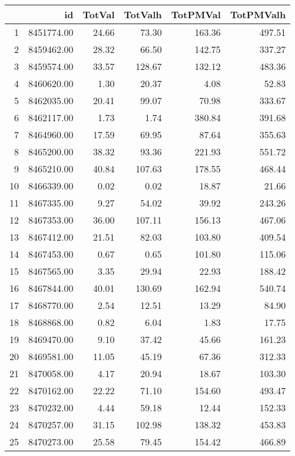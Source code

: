 \begin{table}[ht]
\centering
\begin{tabular}{rrrrrr}
  \hline
 & id & TotVal & TotValh & TotPMVal & TotPMValh \\ 
  \hline
1 & 8451774.00 & 24.66 & 73.30 & 163.36 & 497.51 \\ 
  2 & 8459462.00 & 28.32 & 66.50 & 142.75 & 337.27 \\ 
  3 & 8459574.00 & 33.57 & 128.67 & 132.12 & 483.36 \\ 
  4 & 8460620.00 & 1.30 & 20.37 & 4.08 & 52.83 \\ 
  5 & 8462035.00 & 20.41 & 99.07 & 70.98 & 333.67 \\ 
  6 & 8462117.00 & 1.73 & 1.74 & 380.84 & 391.68 \\ 
  7 & 8464960.00 & 17.59 & 69.95 & 87.64 & 355.63 \\ 
  8 & 8465200.00 & 38.32 & 93.36 & 221.93 & 551.72 \\ 
  9 & 8465210.00 & 40.84 & 107.63 & 178.55 & 468.44 \\ 
  10 & 8466339.00 & 0.02 & 0.02 & 18.87 & 21.66 \\ 
  11 & 8467335.00 & 9.27 & 54.02 & 39.92 & 243.26 \\ 
  12 & 8467353.00 & 36.00 & 107.11 & 156.13 & 467.06 \\ 
  13 & 8467412.00 & 21.51 & 82.03 & 103.80 & 409.54 \\ 
  14 & 8467453.00 & 0.67 & 0.65 & 101.80 & 115.06 \\ 
  15 & 8467565.00 & 3.35 & 29.94 & 22.93 & 188.42 \\ 
  16 & 8467844.00 & 40.01 & 130.69 & 162.94 & 540.74 \\ 
  17 & 8468770.00 & 2.54 & 12.51 & 13.29 & 84.90 \\ 
  18 & 8468868.00 & 0.82 & 6.04 & 1.83 & 17.75 \\ 
  19 & 8469470.00 & 9.10 & 37.42 & 45.66 & 161.23 \\ 
  20 & 8469581.00 & 11.05 & 45.19 & 67.36 & 312.33 \\ 
  21 & 8470058.00 & 4.17 & 20.94 & 18.67 & 103.30 \\ 
  22 & 8470162.00 & 22.22 & 71.10 & 154.60 & 493.47 \\ 
  23 & 8470232.00 & 4.44 & 59.18 & 12.44 & 152.33 \\ 
  24 & 8470257.00 & 31.15 & 102.98 & 138.32 & 453.83 \\ 
  25 & 8470273.00 & 25.58 & 79.45 & 154.42 & 466.89 \\ 

\end{tabular}
\end{table}

